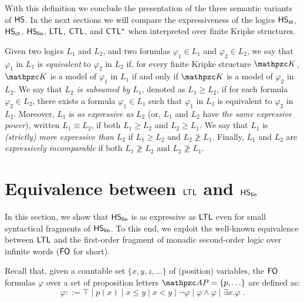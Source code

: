 
With this definition we conclude the presentation of the three semantic variants of $\text{\sffamily HS}$.
In the next sections  we will compare the expressiveness of the logics $\text{\sffamily HS}_{\mathsf{st}}$, $\text{\sffamily HS}_{\mathsf{ct}}$, $\text{\sffamily HS}_{\mathsf{lin}}$, $\text{\sffamily LTL}$, $\text{\sffamily CTL}$, and $\text{\sffamily CTL$^{*}$}$ when interpreted over finite Kripke structures.

Given two logics $L_1$ and $L_2$, and two formulas $\varphi_1\in L_1$ and $\varphi_2\in L_2$, we say that   $\varphi_1$ in $L_1$ is \emph{equivalent} to  $\varphi_2$ in $L_2$ if, for every finite Kripke structure   $\Ku$, 
$\Ku$ is a model of $\varphi_1$ in $L_1$ if and only if $\Ku$ is a model of $\varphi_2$ in $L_2$. 
We say that \emph{$L_2$ is subsumed by $L_1$}, denoted as $L_1\geq L_2$, if for each formula $\varphi_2\in L_2$, there exists a formula $\varphi_1\in L_1$ such that $\varphi_1$ in $L_1$ is equivalent to $\varphi_2$
in $L_2$. Moreover, $L_1$ is \emph{as expressive as} $L_2$ (or, $L_1$  and $L_2$ have \emph{the same expressive power}), written $L_1\equiv L_2$, if both $L_1\geq L_2$ and $L_2\geq L_1$. We say that  $L_1$ is \emph{(strictly) more expressive than} $L_2$ if $L_1\geq L_2$ and $L_2\not\geq L_1$. Finally, $L_1$ and $L_2$ are \emph{expressively incomparable} if both $L_1\not\geq L_2$ and $L_2\not\geq L_1$.



\section{Equivalence between $\text{\sffamily LTL}$ and $\text{\sffamily HS}_{\mathsf{lin}}$}\label{sec:CharacterizezionOfLeniarTimeHS}

In this section, we show that $\text{\sffamily HS}_{\mathsf{lin}}$ is as expressive as $\text{\sffamily LTL}$ even for small syntactical fragments of $\text{\sffamily HS}_{\mathsf{lin}}$. To this end, we exploit the well-known equivalence between $\text{\sffamily LTL}$ and the first-order fragment of monadic second-order logic over infinite words ($\text{\sffamily FO}$ for short). 

Recall that, given a countable set $\{x,y,z,\ldots\}$ of (position) variables, the $\text{\sffamily FO}$ formulas $\varphi$ over a set of proposition letters $\Prop=\{p,\ldots \}$
are defined as:
\[
\varphi ::= \top \mid  p(x) \mid x\leq y \mid x <y  \mid \neg\varphi \mid \varphi \wedge \varphi
 \mid \exists x. \varphi\; .
 \]


